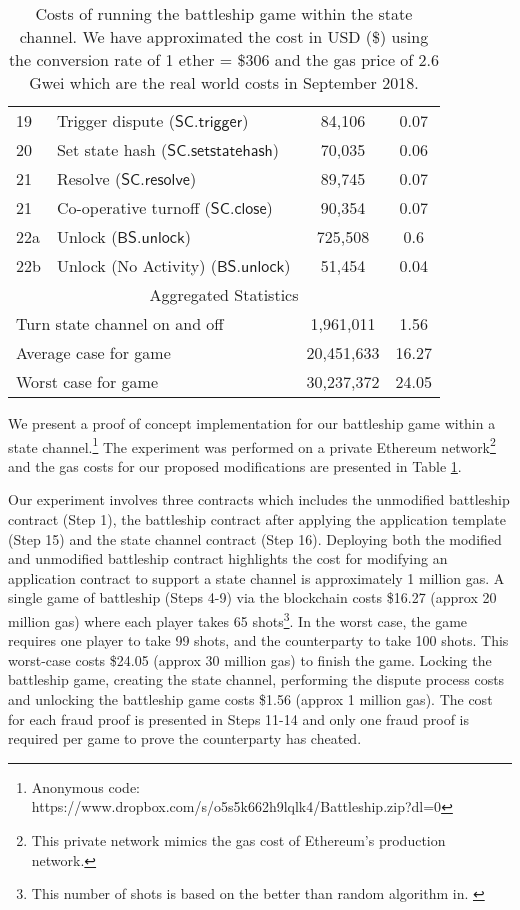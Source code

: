 \documentclass{llncs}
\newcommand{\statechanneldispute}{\mathsf{SC}.\mathsf{trigger}}
\newcommand{\statechannelsetstate}{\mathsf{SC}.\mathsf{setstatehash}}
\newcommand{\statechannelresolve}{\mathsf{SC}.\mathsf{resolve}}
\newcommand{\statechannelclose}{\mathsf{SC}.\mathsf{close}}
\newcommand{\battleshipunlock}{\mathsf{BS.unlock}}
\begin{document}
\begin{table}
\begin{tabular}[]{l l c c}
			19 & Trigger dispute ($\statechanneldispute$) & 84,106 & 0.07\\
			20 & Set state hash ($\statechannelsetstate$) & 70,035 & 0.06 \\
			21 & Resolve ($\statechannelresolve$) &89,745 & 0.07 \\
			21 & Co-operative turnoff ($\statechannelclose$) & 90,354 & 0.07 \\
			22a & Unlock ($\battleshipunlock$) & 725,508 & 0.6 \\
			22b & Unlock (No Activity) ($\battleshipunlock$) & 51,454 & 0.04 \\
			\hline
			\multicolumn{4}{c}{Aggregated Statistics} \\
			\hline
			\multicolumn{2}{l}{Turn state channel on and off} & 1,961,011  & 1.56 \\
			\multicolumn{2}{l}{Average case for game} & 20,451,633 & 16.27 \\
			\multicolumn{2}{l}{Worst case for game} & 30,237,372 & 24.05 \\
			\hline 
		\end{tabular}
		
		\caption{Costs of running the battleship game within the state channel. We have approximated the cost in USD (\$) using the conversion rate of 1 ether = \$306 and the gas price of 2.6 Gwei which are the real world costs in September 2018. }\label{tab:costs}
	\end{table}
	
	
	We present a proof of concept implementation for our battleship game within a state channel.\footnote{Anonymous code: https://www.dropbox.com/s/o5s5k662h9lqlk4/Battleship.zip?dl=0}
	The experiment was performed on a private Ethereum network\footnote{This private network mimics the gas cost of Ethereum's production network.} and the gas costs for our proposed modifications are presented in Table \ref{tab:costs}. 
	
	Our experiment involves three contracts which includes the unmodified battleship contract (Step 1), the battleship contract after applying the application template (Step 15) and the state channel contract (Step 16). 
	Deploying both the modified and unmodified battleship contract highlights the cost for modifying an application contract to support a state channel is approximately 1 million gas. 
	A single game of battleship (Steps 4-9) via the blockchain costs \$16.27 (approx 20 million gas) where each player takes 65 shots\footnote{This number of shots is based on the better than random algorithm in. \cite{battleshipdata}}.
	In the worst case, the game requires one player to take 99 shots, and the counterparty to take 100 shots. 
	This worst-case costs \$24.05 (approx 30 million gas) to finish the game.  
	Locking the battleship game, creating the state channel, performing the dispute process costs and unlocking the battleship game costs \$1.56 (approx 1 million gas). 
	The cost for each fraud proof is presented in Steps 11-14 and only one fraud proof is required per game to prove the counterparty has cheated. 
	
\end{document}
